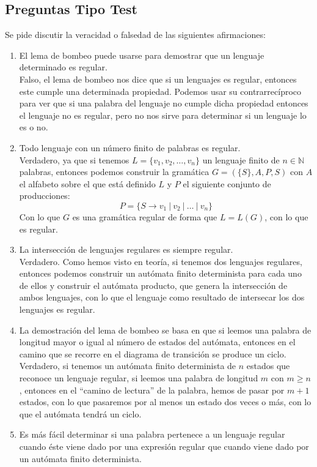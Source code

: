 \subsection{Preguntas Tipo Test}
Se pide discutir la veracidad o falsedad de las siguientes afirmaciones:
\begin{enumerate}
    \item El lema de bombeo puede usarse para demostrar que un lenguaje determinado es regular.\\

        Falso, el lema de bombeo nos dice que si un lenguajes es regular, entonces este cumple una determinada propiedad. Podemos usar su contrarrecíproco para ver que si una palabra del lenguaje no cumple dicha propiedad entonces el lenguaje no es regular, pero no nos sirve para determinar si un lenguaje lo es o no.
    \item Todo lenguaje con un número finito de palabras es regular.\\

        Verdadero, ya que si tenemos $L=\{v_1,v_2,\ldots,v_n\}$ un lenguaje finito de $n\in \mathbb{N}$ palabras, entonces podemos construir la gramática $G=(\{S\}, A, P, S)$ con $A$ el alfabeto sobre el que está definido $L$ y $P$ el siguiente conjunto de producciones:
        \begin{equation*}
            P = \{S \rightarrow v_1\ |\ v_2\ |\ \ldots \ |\ v_n\}
        \end{equation*}
        Con lo que $G$ es una gramática regular de forma que $L = L(G)$, con lo que es regular.
    \item La intersección de lenguajes regulares es siempre regular.\\

        Verdadero. Como hemos visto en teoría, si tenemos dos lenguajes regulares, entonces podemos construir un autómata finito determinista para cada uno de ellos y construir el autómata producto, que genera la intersección de ambos lenguajes, con lo que el lenguaje como resultado de intersecar los dos lenguajes es regular.
    \item La demostración del lema de bombeo se basa en que si leemos una palabra de longitud mayor o igual al número de estados del autómata, entonces en el camino que se recorre en el diagrama de transición se produce un ciclo.\\

        Verdadero, si tenemos un autómata finito determinista de $n$ estados que reconoce un lenguaje regular, si leemos una palabra de longitud $m$ con $m\geq n$, entonces en el ``camino de lectura'' de la palabra, hemos de pasar por $m+1$ estados, con lo que pasaremos por al menos un estado dos veces o más, con lo que el autómata tendrá un ciclo.
    \item Es más fácil determinar si una palabra pertenece a un lenguaje regular cuando éste viene dado por una expresión regular que cuando viene dado por un autómata finito determinista.\\


\end{enumerate}
